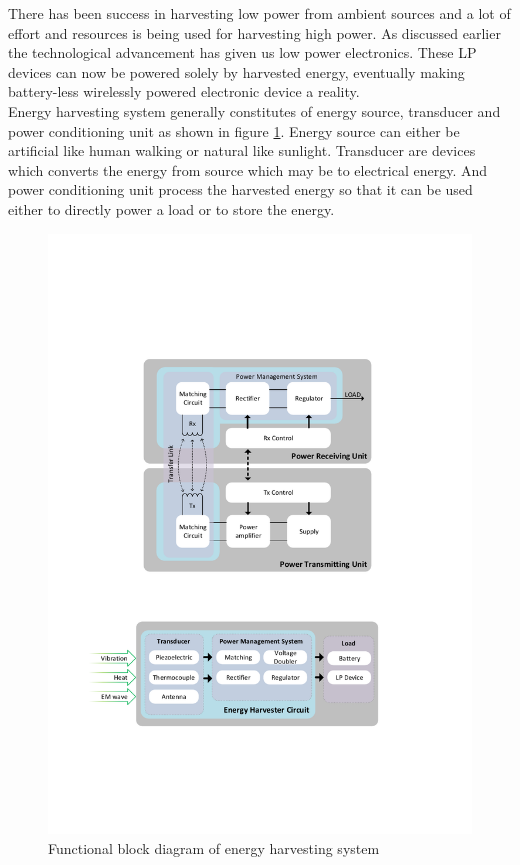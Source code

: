 \documentclass[UKenglish]{ifimaster}  %
\begin{document}
There has been success in harvesting low power from ambient sources and a lot of effort and resources is being used for 
harvesting high power. As discussed earlier the technological advancement has given us low power electronics. 
These LP devices can now be powered solely by harvested energy, eventually making battery-less wirelessly powered 
electronic device a reality. \\

Energy harvesting system generally constitutes of energy source, transducer and power conditioning unit as shown 
in figure \ref{fig:visio_harvest_func}. Energy 
source can either be artificial like human walking or natural like sunlight. Transducer are devices which 
converts the energy from source which may be to electrical energy. And power conditioning unit process the 
harvested energy so that it can be used either to directly power a load or to store the energy. \\

\begin{figure}[!htbp] %
   \centering
   \includegraphics[width=\textwidth]{img/visio_harvest_func.pdf}
   \caption{Functional block diagram of energy harvesting system}
   \label{fig:visio_harvest_func}
\end{figure}
\end{document}
